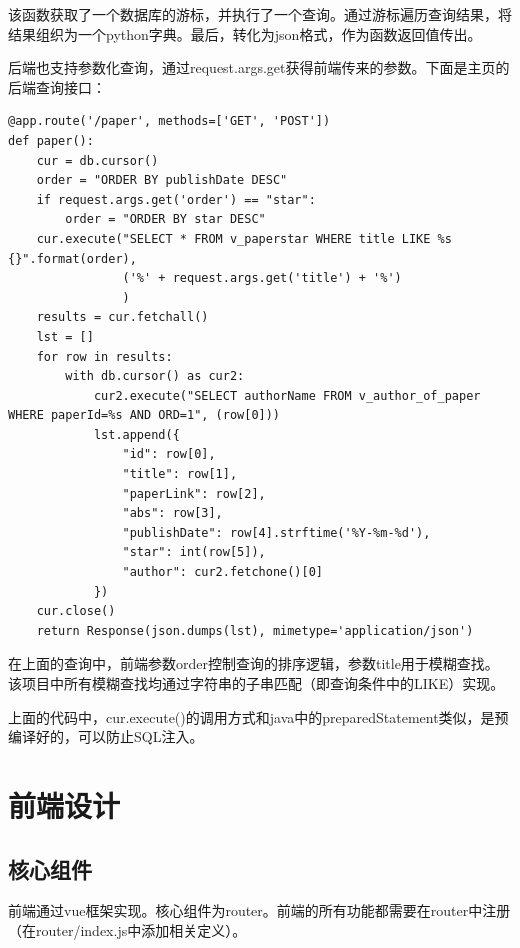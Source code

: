 该函数获取了一个数据库的游标，并执行了一个查询。通过游标遍历查询结果，将结果组织为一个python字典。最后，转化为json格式，作为函数返回值传出。

后端也支持参数化查询，通过request.args.get获得前端传来的参数。下面是主页的后端查询接口：

\scriptsize
\begin{verbatim}
@app.route('/paper', methods=['GET', 'POST'])
def paper():
    cur = db.cursor()
    order = "ORDER BY publishDate DESC"
    if request.args.get('order') == "star":
        order = "ORDER BY star DESC"
    cur.execute("SELECT * FROM v_paperstar WHERE title LIKE %s {}".format(order),
                ('%' + request.args.get('title') + '%')
                )
    results = cur.fetchall()
    lst = []
    for row in results:
        with db.cursor() as cur2:
            cur2.execute("SELECT authorName FROM v_author_of_paper WHERE paperId=%s AND ORD=1", (row[0]))
            lst.append({
                "id": row[0],
                "title": row[1],
                "paperLink": row[2],
                "abs": row[3],
                "publishDate": row[4].strftime('%Y-%m-%d'),
                "star": int(row[5]),
                "author": cur2.fetchone()[0]
            })
    cur.close()
    return Response(json.dumps(lst), mimetype='application/json')
\end{verbatim}
\normalsize

在上面的查询中，前端参数order控制查询的排序逻辑，参数title用于模糊查找。该项目中所有模糊查找均通过字符串的子串匹配（即查询条件中的LIKE）实现。

上面的代码中，cur.execute()的调用方式和java中的preparedStatement类似，是预编译好的，可以防止SQL注入。

\section{前端设计}

\subsection{核心组件}
前端通过vue框架实现。核心组件为router。前端的所有功能都需要在router中注册（在router/index.js中添加相关定义）。

